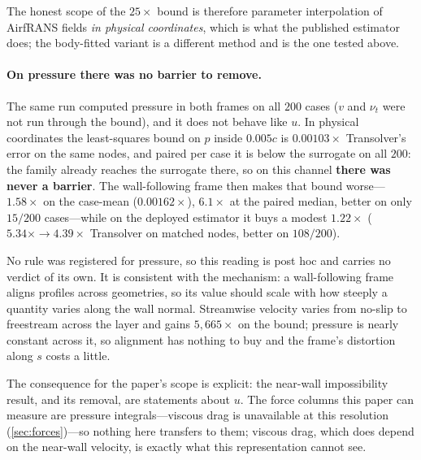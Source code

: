 The honest scope of the $25\times$ bound is therefore parameter interpolation of
AirfRANS fields \emph{in physical coordinates}, which is what the published estimator does;
the body-fitted variant is a different method and is the one tested above.

\paragraph{On pressure there was no barrier to remove.} The same run computed pressure in
both frames on all $200$ cases ($v$ and $\nu_t$ were not run through the bound), and it
does not behave like $u$. In physical coordinates the least-squares bound on $p$ inside
$0.005c$ is $\mathbf{0.00103\times}$ Transolver's error on the same nodes, and paired per case it is
below the surrogate on all $200$: the family already reaches the surrogate there, so on
this channel \textbf{there was never a barrier}. The wall-following frame then makes that
bound worse---$1.58\times$ on the case-mean ($0.00162\times$), $6.1\times$ at the paired
median, better on only $15/200$ cases---while on the deployed estimator it buys a modest
$1.22\times$ ($5.34\times\to4.39\times$ Transolver on matched nodes, better on $108/200$).

No rule was registered for pressure, so this reading is post hoc and carries no verdict of
its own. It is consistent with the mechanism: a wall-following frame aligns profiles across
geometries, so its value should scale with how steeply a quantity varies along the wall
normal. Streamwise velocity varies from no-slip to freestream across the layer and gains
$5{,}665\times$ on the bound; pressure is nearly constant across it, so alignment has
nothing to buy and the frame's distortion along $s$ costs a little.

The consequence for the paper's scope is explicit: the near-wall impossibility result, and
its removal, are statements about $u$. The force columns this paper can measure are
pressure integrals---viscous drag is unavailable at this resolution (\autoref{sec:forces})---so
nothing here transfers to them; viscous drag, which does depend on the near-wall velocity,
is exactly what this representation cannot see.

